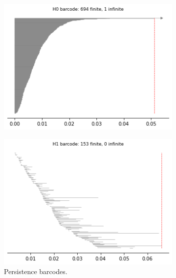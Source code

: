 \begin{figure}[H]
\begin{subfigure}[b]{0.25\textwidth}
\end{subfigure}
\begin{subfigure}[b]{0.24\textwidth}
    \includegraphics[width=\textwidth]{figures/X6_H0_barcode.png}
    \caption{}
\end{subfigure}
\begin{subfigure}[b]{0.24\textwidth}
    \includegraphics[width=\textwidth]{figures/X6_H1_barcode.png}
        \caption{Persistence barcodes.}
\end{subfigure}
\begin{subfigure}[b]{0.24\textwidth}

\end{subfigure}
\end{figure}
